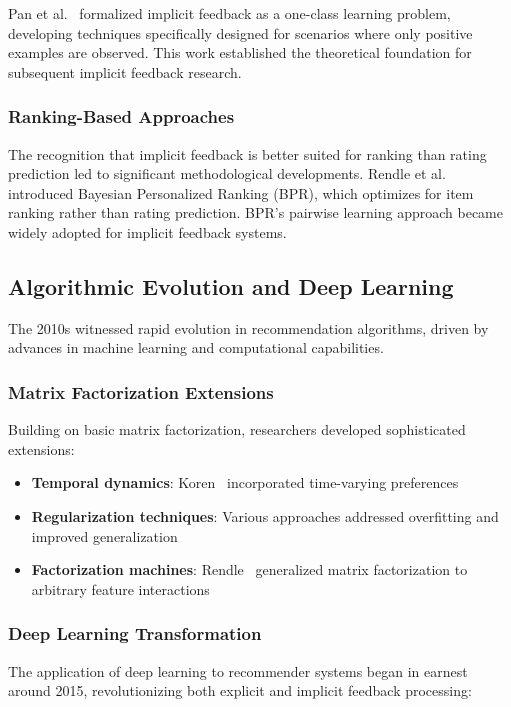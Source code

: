 Pan et al.~\cite{pan2008one} formalized implicit feedback as a one-class learning problem, developing techniques specifically designed for scenarios where only positive examples are observed. This work established the theoretical foundation for subsequent implicit feedback research.

\subsubsection{Ranking-Based Approaches}
The recognition that implicit feedback is better suited for ranking than rating prediction led to significant methodological developments. Rendle et al.~\cite{rendle2009bpr} introduced Bayesian Personalized Ranking (BPR), which optimizes for item ranking rather than rating prediction. BPR's pairwise learning approach became widely adopted for implicit feedback systems.

\subsection{Algorithmic Evolution and Deep Learning}

The 2010s witnessed rapid evolution in recommendation algorithms, driven by advances in machine learning and computational capabilities.

\subsubsection{Matrix Factorization Extensions}
Building on basic matrix factorization, researchers developed sophisticated extensions:
\begin{itemize}
    \item \textbf{Temporal dynamics}: Koren~\cite{koren2009collaborative} incorporated time-varying preferences
    \item \textbf{Regularization techniques}: Various approaches addressed overfitting and improved generalization
    \item \textbf{Factorization machines}: Rendle~\cite{rendle2012factorization} generalized matrix factorization to arbitrary feature interactions
\end{itemize}

\subsubsection{Deep Learning Transformation}
The application of deep learning to recommender systems began in earnest around 2015, revolutionizing both explicit and implicit feedback processing:

